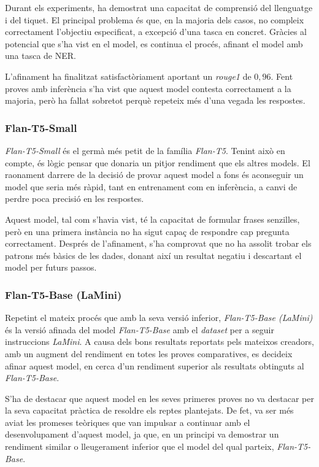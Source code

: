 Durant els experiments, ha demostrat una capacitat de comprensió del llenguatge i del tiquet. El principal problema és que, en la majoria dels casos, no compleix correctament l'objectiu especificat, a excepció d'una tasca en concret. Gràcies al potencial que s'ha vist en el model, es continua el procés, afinant el model amb una tasca de NER.

L'afinament ha finalitzat satisfactòriament aportant un \textit{rouge1} de $0,96$. Fent proves amb inferència s'ha vist que aquest model contesta correctament a la majoria, però ha fallat sobretot perquè repeteix més d'una vegada les respostes.

\subsubsection{Flan-T5-Small}
\textit{Flan-T5-Small} \cite{flan-t5} és el germà més petit de la família \textit{Flan-T5}. Tenint això en compte, és lògic pensar que donaria un pitjor rendiment que els altres models. El raonament darrere de la decisió de provar aquest model a fons és aconseguir un model que seria més ràpid, tant en entrenament com en inferència, a canvi de perdre poca precisió en les respostes.

Aquest model, tal com s'havia vist, té la capacitat de formular frases senzilles, però en una primera instància no ha sigut capaç de respondre cap pregunta correctament. Després de l'afinament, s'ha comprovat que no ha assolit trobar els patrons més bàsics de les dades, donant així un resultat negatiu i descartant el model per futurs passos.

\subsubsection{Flan-T5-Base (LaMini)}
Repetint el mateix procés que amb la seva versió inferior, \textit{Flan-T5-Base (LaMini)} \cite{flan-t5} \cite{lamini} és la versió afinada del model \textit{Flan-T5-Base} amb el \textit{dataset} per a seguir instruccions \textit{LaMini}. A causa dels bons resultats reportats pels mateixos creadors, amb un augment del rendiment en totes les proves comparatives, es decideix afinar aquest model, en cerca d'un rendiment superior als resultats obtinguts al \textit{Flan-T5-Base}. 

S'ha de destacar que aquest model en les seves primeres proves no va destacar per la seva capacitat pràctica de resoldre els reptes plantejats. De fet, va ser més aviat les promeses teòriques que van impulsar a continuar amb el desenvolupament d'aquest model, ja que, en un principi va demostrar un rendiment similar o lleugerament inferior que el model del qual parteix, \textit{Flan-T5-Base}.

